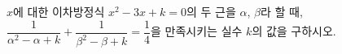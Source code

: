 $x$에 대한 이차방정식 $x^2-3x+k=0$의 두 근을 $\alpha$, $\beta$라 할 때, $\dfrac{1}{\alpha^2-\alpha+k}+\dfrac{1}{\beta^2-\beta+k}=\dfrac{1}{4}$을 만족시키는 실수 $k$의 값을 구하시오.
